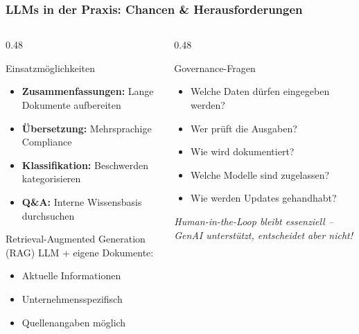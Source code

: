 \documentclass[11pt, aspectratio=169]{beamer}
\begin{document}
\begin{frame}
    \frametitle{LLMs in der Praxis: Chancen \& Herausforderungen}
    \begin{columns}[t]
        \begin{column}{0.48\textwidth}
            \begin{block}{Einsatzmöglichkeiten}
                \begin{itemize}
                    \item \textbf{Zusammenfassungen:} Lange Dokumente aufbereiten
                    \item \textbf{Übersetzung:} Mehrsprachige Compliance
                    \item \textbf{Klassifikation:} Beschwerden kategorisieren
                    \item \textbf{Q\&A:} Interne Wissensbasis durchsuchen
                \end{itemize}
            \end{block}
            \vspace{0.2cm}
            \begin{block}{Retrieval-Augmented Generation (RAG)}
                LLM + eigene Dokumente:
                \begin{itemize}
                    \item Aktuelle Informationen
                    \item Unternehmensspezifisch
                    \item Quellenangaben möglich
                \end{itemize}
            \end{block}
        \end{column}
        \begin{column}{0.48\textwidth}
            \begin{alertblock}{Governance-Fragen}
                \begin{itemize}
                    \item Welche Daten dürfen eingegeben werden?
                    \item Wer prüft die Ausgaben?
                    \item Wie wird dokumentiert?
                    \item Welche Modelle sind zugelassen?
                    \item Wie werden Updates gehandhabt?
                \end{itemize}
            \end{alertblock}
            \vspace{0.2cm}
            \textit{\glqq Human-in-the-Loop\grqq{} bleibt essenziell -- GenAI unterstützt, entscheidet aber nicht!}
        \end{column}
    \end{columns}
\end{frame}
\end{document}
